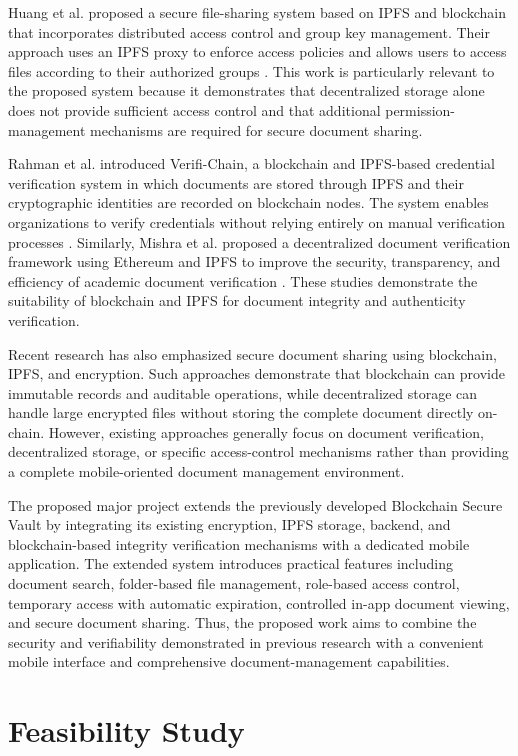 \documentclass[12pt]{article}
\begin{document}
Huang et al. proposed a secure file-sharing system based on IPFS and blockchain that incorporates distributed access control and group key management. Their approach uses an IPFS proxy to enforce access policies and allows users to access files according to their authorized groups \cite{huang2020}. This work is particularly relevant to the proposed system because it demonstrates that decentralized storage alone does not provide sufficient access control and that additional permission-management mechanisms are required for secure document sharing.

Rahman et al. introduced Verifi-Chain, a blockchain and IPFS-based credential verification system in which documents are stored through IPFS and their cryptographic identities are recorded on blockchain nodes. The system enables organizations to verify credentials without relying entirely on manual verification processes \cite{rahman2023}. Similarly, Mishra et al. proposed a decentralized document verification framework using Ethereum and IPFS to improve the security, transparency, and efficiency of academic document verification \cite{mishra2025}. These studies demonstrate the suitability of blockchain and IPFS for document integrity and authenticity verification.

Recent research has also emphasized secure document sharing using blockchain, IPFS, and encryption. Such approaches demonstrate that blockchain can provide immutable records and auditable operations, while decentralized storage can handle large encrypted files without storing the complete document directly on-chain. However, existing approaches generally focus on document verification, decentralized storage, or specific access-control mechanisms rather than providing a complete mobile-oriented document management environment.

The proposed major project extends the previously developed Blockchain Secure Vault by integrating its existing encryption, IPFS storage, backend, and blockchain-based integrity verification mechanisms with a dedicated mobile application. The extended system introduces practical features including document search, folder-based file management, role-based access control, temporary access with automatic expiration, controlled in-app document viewing, and secure document sharing. Thus, the proposed work aims to combine the security and verifiability demonstrated in previous research with a convenient mobile interface and comprehensive document-management capabilities.
\newpage
\section{Feasibility Study}
\end{document}
